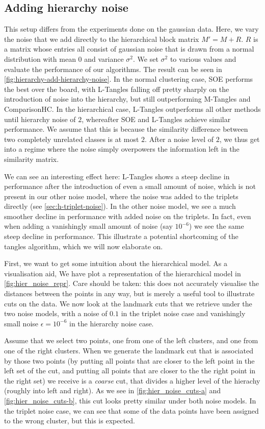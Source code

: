 \subsection{Adding hierarchy noise}\label{sec:adding-hierarchy-noise}
This setup differs from the experiments done on the gaussian data. Here, we vary the noise that we add directly to the hierarchical block matrix $M' = M + R$. 
$R$ is a matrix whose entries all consist of gaussian noise that is drawn from a normal distribution with mean $0$ and variance $\sigma^2$. We set $\sigma^2$ to various 
values and evaluate the performance of our algorithms. The result can be seen in \autoref{fig:hierarchy-add-hierarchy-noise}. In the normal clustering case, 
SOE performs the best over the board, with L-Tangles
falling off pretty sharply on the introduction of noise into the hierarchy, but still outperforming M-Tangles and ComparisonHC. In the hierarchical case, L-Tangles outperforms all other methods until hierarchy noise of $2$, whereafter SOE and L-Tangles achieve similar performance. We assume that this is because 
the similarity difference between two completely unrelated classes is at most $2$. After a noise level 
of $2$, we thus get into a regime where the noise simply overpowers the information left in the similarity matrix.

We can see an interesting effect here: L-Tangles shows a steep decline in performance after the introduction of even a small amount of noise, which is not present in our other noise model, 
where the noise was added to the triplets directly (see \autoref{sec:h-triplet-noise}).
In the other noise model, we see a much smoother decline in performance with added noise on the triplets. 
In fact, even when adding a vanishingly small amount of noise (say $10^{-6}$) we see the same steep decline in performance. 
This illustrate a potential shortcoming of the tangles algorithm, which we will now elaborate on.

First, we want to get some intuition about the hierarchical model.
As a visualisation aid, We have plot a representation of the hierarchical model in \autoref{fig:hier_noise_repr}. Care should be taken: this does not accurately visualise the distances between
the points in any way, but is merely a useful tool to illustrate cuts on the data. We now look at the landmark cuts that we retrieve under the two noise models, with a noise of $0.1$ in the triplet 
noise case and vanishingly small noise $\epsilon = 10^{-6}$ in the hierarchy noise case. 

Assume that we select two points, one from one of the left clusters, and one from one of the right clusters. When we generate the landmark cut that is associated by those two points
(by putting all points that are closer to the left point in the left set of the cut, and putting all points that are closer to the the right point in the right set) 
we receive is a \textit{coarse} cut, that divides a higher level of the hierachy (roughly into left and right). As we see in \autoref{fig:hier_noise_cuts-a} and \autoref{fig:hier_noise_cuts-b}, 
this cut looks pretty similar under both noise models. 
In the triplet noise case, we can see that  some of the data points have been assigned to the wrong cluster, but this is expected. 

